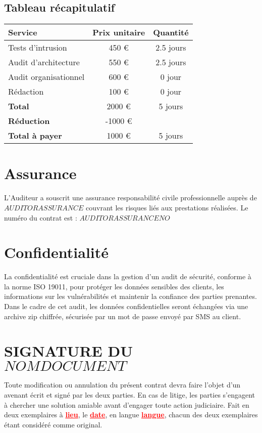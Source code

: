 \documentclass[12pt]{extarticle}
\begin{document}
\subsection{Tableau récapitulatif}
\begin{center}
    \begin{tabular}{lcc}
        \toprule
        \textbf{Service} & \textbf{Prix unitaire} & \textbf{Quantité} \\
        \midrule
        Tests d'intrusion & 450 € & 2.5 jours \\
        Audit d'architecture & 550 € & 2.5 jours \\
        Audit organisationnel & 600 € & 0 jour \\
        Rédaction & 100 € & 0 jour \\
        \midrule
        \textbf{Total} & 2000 € & 5 jours \\
        \midrule
        \textbf{Réduction} & -1000 € &  \\
        \midrule
        \textbf{Total à payer} & 1000 € & 5 jours \\
        \bottomrule
    \end{tabular}
\end{center}
\newpage
\section{Assurance}
L'Auditeur a souscrit une assurance responsabilité civile professionnelle auprès de \textit{$AUDITORASSURANCE$} couvrant les risques liés aux prestations réalisées.
Le numéro du contrat est : \textit{$AUDITORASSURANCENO$}
\section{Confidentialité}
La confidentialité est cruciale dans la gestion d'un audit de sécurité, conforme à la norme ISO 19011, pour protéger les données sensibles des clients, les informations sur les vulnérabilités et maintenir la confiance des parties prenantes.
Dans le cadre de cet audit, les données confidentielles seront échangées via une archive zip chiffrée, sécurisée par un mot de passe envoyé par SMS au client.
\newpage
\section{SIGNATURE DU $NOMDOCUMENT$}
Toute modification ou annulation du présent contrat devra faire l'objet d'un avenant écrit et signé par les deux parties. En cas de litige, les parties s'engagent à chercher une solution amiable avant d'engager toute action judiciaire.
Fait en deux exemplaires à \textcolor{red}{\textbf{\underline{lieu}}}, le \textcolor{red}{\textbf{\underline{date}}}, en langue \textcolor{red}{\textbf{\underline{langue}}}, chacun des deux exemplaires étant considéré comme original.
\end{document}
